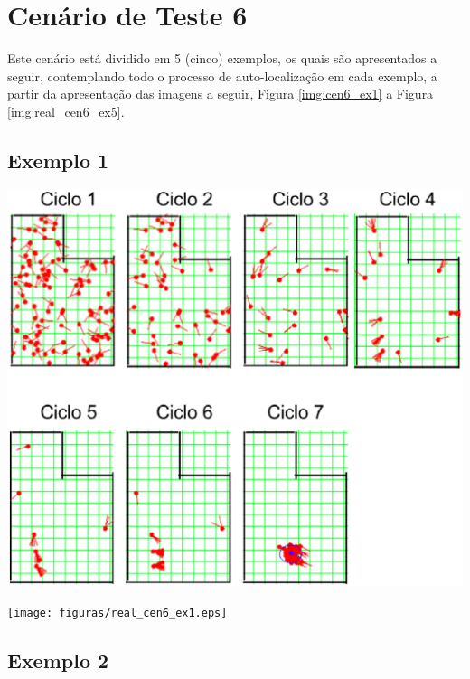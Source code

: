 \section{Cenário de Teste 6}
\label{sec:cenario6}

Este cenário está dividido em 5 (cinco) exemplos, os quais são apresentados a seguir, contemplando todo o processo de auto-localização
em cada exemplo, a partir da apresentação das imagens a seguir, Figura \ref{img:cen6_ex1} a Figura \ref{img:real_cen6_ex5}.

\subsection{Exemplo 1}

{\centering
\includegraphics[scale=0.4]{figuras/cen6_ex1.eps}
\label{img:cen6_ex1}
\par}

{\centering
\texttt{[image: figuras/real\_cen6\_ex1.eps]}
\label{img:real_cen6_ex1}
\par}

\subsection{Exemplo 2}

